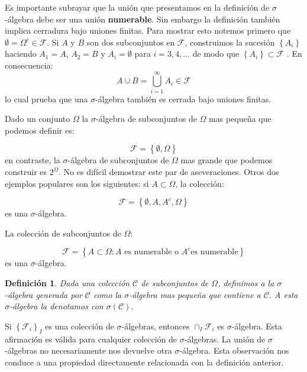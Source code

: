 \documentclass{extreport}
\theoremstyle{definicion}
\newtheorem{definition}{Definición}[chapter]
\theoremstyle{propiedad}
\begin{document}
Es importante subrayar que la unión que presentamos en la definición de $\sigma$-álgebra debe ser una unión \textbf{numerable}. Sin embargo la definición también implica cerradura bajo uniones finitas. Para mostrar esto notemos primero que $\emptyset = \Omega^c \in \mathcal{F}$.  Si $A$ y $B$ son dos subconjuntos en $\mathcal{F}$, construimos la sucesión $\left\{A_i\right\}$ haciendo $A_1 = A$, $A_2 = B$ y $A_i = \emptyset$ para $i= 3,4,\ldots$ de modo  que  $\left\{A_i\right\}\subset \mathcal{F}$ . En consecuencia:
$$
A \cup B = \bigcup_{i = 1}^\infty A_i \in \mathcal{F}
$$
lo cual prueba que una $\sigma$-álgebra también es cerrada bajo uniones finitas. 

Dado un conjunto $\Omega$ la $\sigma$-álgebra de subconjuntos de $\Omega$ mas pequeña que podemos definir es:

$$
\mathcal{F} = \left\{\emptyset, \Omega\right\}
$$
en contraste, la $\sigma$-álgebra de subconjuntos de $\Omega$  mas grande que podemos construir es $2^\Omega$. No es difícil demostrar este par de aseveraciones. Otros dos ejemplos populares son los siguientes: si $A\subset \Omega$, la colección:

$$
\mathcal{F} = \left\{\emptyset, A, A^c,\Omega\right\}
$$
es una $\sigma$-álgebra.

La colección de subconjuntos de $\Omega$:

$$
\mathcal{F} = \left\{A\subset \Omega: A \text{ es numerable o } A^c \text{es numerable}\right\}
$$
es una $\sigma$-álgebra.



\begin{definition}
Dada una colección $\mathcal{C}$ de subconjuntos de $\Omega$, definimos a la $\sigma$-álgebra generada por $\mathcal{C}$ como la $\sigma$-álgebra mas pequeña que contiene a $\mathcal{C}$. A esta $\sigma$-álgebra la denotamos con $\sigma(\mathcal{C})$.    
\end{definition}

Si $\left\{\mathcal{F}_i\right\}_I$ es una colección de $\sigma$-álgebras, entonces $\cap_I \mathcal{F}_i$ es $\sigma$-álgebra.  Esta afirmación es válida para cualquier colección de $\sigma$-álgebras. La unión de $\sigma$-álgebras no necesariamente nos devuelve otra $\sigma$-álgebra. Esta observación nos conduce a una propiedad directamente relacionada con la definición anterior.
\end{document}
